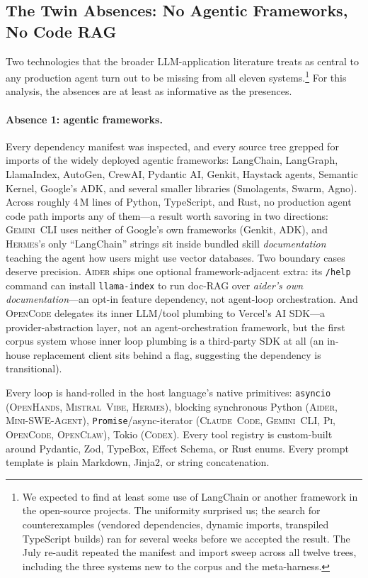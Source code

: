 \documentclass[11pt,a4paper]{article}
\newcommand{\clcode}{\textsc{Claude~Code}\xspace}
\newcommand{\cdx}{\textsc{Codex}\xspace}
\newcommand{\oh}{\textsc{OpenHands}\xspace}
\newcommand{\adr}{\textsc{Aider}\xspace}
\newcommand{\mswe}{\textsc{Mini-SWE-Agent}\xspace}
\newcommand{\ocl}{\textsc{OpenClaw}\xspace}
\newcommand{\vibe}{\textsc{Mistral~Vibe}\xspace}
\newcommand{\gemini}{\textsc{Gemini~CLI}\xspace}
\newcommand{\hrm}{\textsc{Hermes}\xspace}
\newcommand{\pib}{\textsc{Pi}\xspace}
\newcommand{\ocd}{\textsc{OpenCode}\xspace}
\begin{document}
\subsection{The Twin Absences: No Agentic Frameworks, No Code RAG}
\label{sec:twin_absences}

Two technologies that the broader LLM-application literature treats as central to any production agent turn out to be missing from all eleven systems.\footnote{We expected to find at least some use of LangChain or another framework in the open-source projects. The uniformity surprised us; the search for counterexamples (vendored dependencies, dynamic imports, transpiled TypeScript builds) ran for several weeks before we accepted the result. The July re-audit repeated the manifest and import sweep across all twelve trees, including the three systems new to the corpus and the meta-harness.}
For this analysis, the absences are at least as informative as the presences.

\paragraph{Absence 1: agentic frameworks.}
Every dependency manifest was inspected, and every source tree grepped for imports of the widely deployed agentic frameworks: LangChain, LangGraph, LlamaIndex, AutoGen, CrewAI, Pydantic AI, Genkit, Haystack agents, Semantic Kernel, Google's ADK, and several smaller libraries (Smolagents, Swarm, Agno).
Across roughly 4\,M lines of Python, TypeScript, and Rust, no production agent code path imports any of them---a result worth savoring in two directions: \gemini{} uses neither of Google's own frameworks (Genkit, ADK), and \hrm{}'s only ``LangChain'' strings sit inside bundled skill \emph{documentation} teaching the agent how users might use vector databases.
Two boundary cases deserve precision.
\adr{} ships one optional framework-adjacent extra: its \texttt{/help} command can install \texttt{llama-index} to run doc-RAG over \emph{aider's own documentation}---an opt-in feature dependency, not agent-loop orchestration.
And \ocd{} delegates its inner LLM/tool plumbing to Vercel's AI SDK---a provider-abstraction layer, not an agent-orchestration framework, but the first corpus system whose inner loop plumbing is a third-party SDK at all (an in-house replacement client sits behind a flag, suggesting the dependency is transitional).

Every loop is hand-rolled in the host language's native primitives: \texttt{asyncio} (\oh{}, \vibe{}, \hrm{}), blocking synchronous Python (\adr{}, \mswe{}), \texttt{Promise}/async-iterator (\clcode{}, \gemini{}, \pib{}, \ocd{}, \ocl{}), Tokio (\cdx{}).
Every tool registry is custom-built around Pydantic, Zod, TypeBox, Effect Schema, or Rust enums.
Every prompt template is plain Markdown, Jinja2, or string concatenation.
\end{document}
